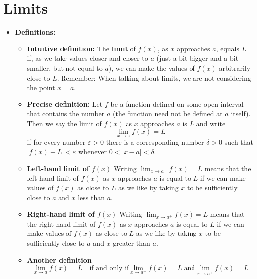 \documentclass[11pt]{article}
\theoremstyle{definition}
\theoremstyle{remark}
\begin{document}
\section{Limits}
\begin{itemize}


\item\textbf{Definitions:}
\begin{itemize}

\item\textbf{Intuitive definition:}
The \textbf{limit} of $f(x)$, as $x$ approaches $a$, equals $L$ if, as we take values closer and closer to $a$ (just a bit bigger and a bit smaller, but not equal to $a$), we can make the values of $f(x)$ arbitrarily close to $L$.  Remember: When talking about limits, we are not considering the point $x=a$. 

\item\textbf{Precise definition:}
Let $f$ be a function defined on some open interval that contains the number $a$ (the function need not be defined at $a$ itself). Then we say the limit of $f(x)$ as $x$ approaches $a$ is $L$ and write
\[\lim_{x\to a} f(x) = L \] if for every number $\varepsilon > 0$ there is a corresponding number $\delta > 0$ such that $|f(x) - L| < \varepsilon$ whenever $0 < |x-a| < \delta$. 

\item\textbf{Left-hand limit of $f(x)$}
Writing $\lim_{x \to a^-}f(x)=L$ means that the left-hand limit of $f(x)$ as $x$ approaches $a$ is equal to $L$ if we can make values of $f(x)$ as close to $L$ as we like by taking $x$ to be sufficiently close to $a$ and $x$ less than $a$. 

\item\textbf{Right-hand limit of $f(x)$}
Writing $\lim_{x \to a^+}f(x)=L$ means that the right-hand limit of $f(x)$ as $x$ approaches $a$ is equal to $L$ if we can make values of $f(x)$ as close to $L$ as we like by taking $x$ to be sufficiently close to $a$ and $x$ greater than $a$. 

\item\textbf{Another definition}
\[\lim_{x\to a} f(x) = L \quad \text{if and only if} \lim_{x \to a^-}f(x) = L \; \text{and} \lim_{x \to a^+}f(x)=L \]
\end{itemize}


\end{itemize}
\end{document}
